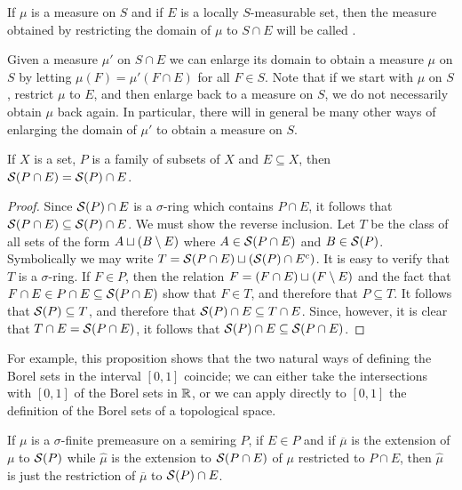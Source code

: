 \begin{definition}
If $\mu$ is a measure on $S$ and if $E$ is a locally $S$-measurable set, then the measure obtained by restricting the domain of $\mu$ to $S\cap E$ will be called .
\end{definition}

Given a measure $\mu'$ on $S\cap E$ we can enlarge its domain to obtain a measure $\mu$ on $S$ by letting $\mu(F)=\mu'(F\cap E)$ for all $F\in S$. Note that if we start with $\mu$ on $S$, restrict $\mu$ to $E$, and then enlarge back to a measure on $S$, we do not necessarily obtain $\mu$ back again. In particular, there will in general be many other ways of enlarging the domain of $\mu'$ to obtain a measure on $S$.

\begin{proposition}\label{prop:sring generated by intersection}
If $X$ is a set, $P$ is a family of subsets of $X$ and $E\subseteq X$, then ${\cal S}(P\cap E)={\cal S}(P)\cap E$.
\end{proposition}

\begin{proof}
Since ${\cal S}(P)\cap E$ is a $\sigma$-ring which contains $P\cap E$, it follows that ${\cal S}(P\cap E)\subseteq{\cal S}(P)\cap E$. We must show the reverse inclusion. Let $T$ be the class of all sets of the form $A\sqcup(B\setminus E)$ where $A\in{\cal S}(P\cap E)$ and $B\in{\cal S}(P)$. Symbolically we may write $T={\cal S}(P\cap E)\sqcup({\cal S}(P)\cap{E}^c)$. It is easy to verify that $T$ is a $\sigma$-ring. If $F\in P$, then the relation $F=(F\cap E)\sqcup(F\setminus E)$ and the fact that $F\cap E\in P\cap E\subseteq{\cal S}(P\cap E)$ show that $F\in T$, and therefore that $P\subseteq T$. It follows that ${\cal S}(P)\subseteq T$, and therefore that ${\cal S}(P)\cap E\subseteq T\cap E$. Since, however, it is clear that $T\cap E={\cal S}(P\cap E)$, it follows that ${\cal S}(P)\cap E\subseteq{\cal S}(P\cap E)$.
\end{proof}

For example, this proposition shows that the two natural ways of defining the Borel sets in the interval $[0,1]$ coincide; we can either take the intersections with $[0,1]$ of the Borel sets in $\mathbb{R}$, or we can apply directly to $[0,1]$ the definition of the Borel sets of a topological space.

\begin{corollary}
If $\mu$ is a $\sigma$-finite premeasure on a semiring $P$, if $E\in P$ and if $\overline{\mu}$ is the extension of $\mu$ to ${\cal S}(P)$ while $\widehat{\mu}$ is the extension to ${\cal S}(P\cap E)$ of $\mu$ restricted to $P\cap E$, then $\widehat{\mu}$ is just the restriction of $\overline{\mu}$ to ${\cal S}(P)\cap E$.
\end{corollary}

